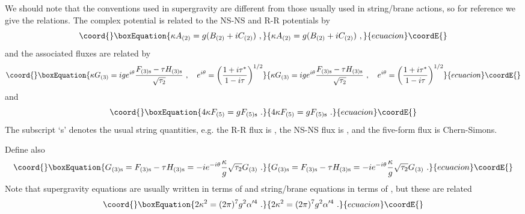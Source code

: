 \documentclass[a4paper,12pt]{article}
\renewcommand{\=}[1]{\bar{#1}}
\begin{document}
We should note that the conventions used in supergravity are different from
those
usually used in string/brane actions, so for reference we give the relations.
The complex potential is related to the NS-NS and R-R potentials by
\begin{equation}\coord{}\boxEquation{
\kappa A_{(2)} = g( B_{(2)} + i C_{(2)} )\ ,
}{
\kappa A_{(2)} = g( B_{(2)} + i C_{(2)} )\ ,
}{ecuacion}\coordE{}\end{equation}
and the associated fluxes are related by
\begin{equation}\coord{}\boxEquation{
\kappa G_{(3)} = i g e^{i\theta} \frac{F_{(3)\rm s} - \tau
H_{(3)\rm s}}{\sqrt{\tau_2}} \ ,\quad e^{i\theta} =
\biggl( \frac{1 + i \tau^*}{1 - i \tau}  \biggr)^{1/2}
\label{G3}
}{
\kappa G_{(3)} = i g e^{i\theta} \frac{F_{(3)\rm s} - \tau
H_{(3)\rm s}}{\sqrt{\tau_2}} \ ,\quad e^{i\theta} =
\biggl( \frac{1 + i \tau^*}{1 - i \tau}  \biggr)^{1/2}
}{ecuacion}\coordE{}\end{equation}
and
\begin{equation}\coord{}\boxEquation{
4\kappa F_{(5)} = g F_{(5)\rm s}\ .
}{
4\kappa F_{(5)} = g F_{(5)\rm s}\ .
}{ecuacion}\coordE{}\end{equation}
The subscript `s' denotes the usual string quantities, e.g. the R-R flux is
\coordHE{}, the NS-NS flux is \coordHE{},
and the
five-form flux is \coordHE{}Chern-Simons.

Define also
\begin{equation}\coord{}\boxEquation{
G_{(3)\rm s} = F_{(3)\rm s} - \tau H_{(3)\rm s} = -i e^{-i\theta}
\frac{\kappa}{g}
\sqrt{\tau_2} G_{(3)}\ .
\label{G3s}
}{
G_{(3)\rm s} = F_{(3)\rm s} - \tau H_{(3)\rm s} = -i e^{-i\theta}
\frac{\kappa}{g}
\sqrt{\tau_2} G_{(3)}\ .
}{ecuacion}\coordE{}\end{equation}
Note that supergravity equations are usually written in terms of \myHighlight{$\kappa$}\coordHE{} and
string/brane equations in terms of \coordHE{}, but these are related
\begin{equation}\coord{}\boxEquation{
2\kappa^2 = (2 \pi)^7 g^2 \alpha'^4 \ .
}{
2\kappa^2 = (2 \pi)^7 g^2 \alpha'^4 \ .
}{ecuacion}\coordE{}\end{equation}
\end{document}
